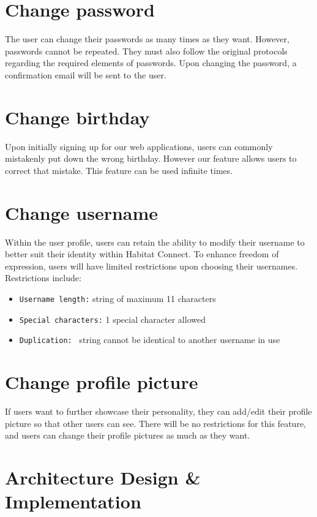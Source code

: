 \documentclass[conference]{IEEEtran}
\begin{document}
\section*{Change password}
The user can change their passwords as many times as they want. However, passwords cannot be repeated. They must also follow the original protocols regarding the required elements of passwords. Upon changing the password, a confirmation email will be sent to the user.
\section*{Change birthday}
Upon initially signing up for our web applications, users can commonly mistakenly put down the wrong birthday. However our feature allows users to correct that mistake. This feature can be used infinite times.
\section*{Change username}
Within the user profile, users can retain the ability to modify their username to better suit their  identity within Habitat Connect. To enhance freedom of expression, users will have limited restrictions upon choosing their usernames. Restrictions include:
\begin{itemize}
    \item \texttt{Username length:} string of maximum 11 characters
    \item \texttt{Special characters:} 1 special character allowed
    \item \texttt{Duplication: } string cannot be identical to another username in use
\end{itemize}
\section*{Change profile picture}
If users want to further showcase their personality, they can add/edit their profile picture so that other users can see. There will be no restrictions for this feature, and users can change their profile pictures as much as they want.



\section{Architecture Design \& Implementation}
\end{document}
